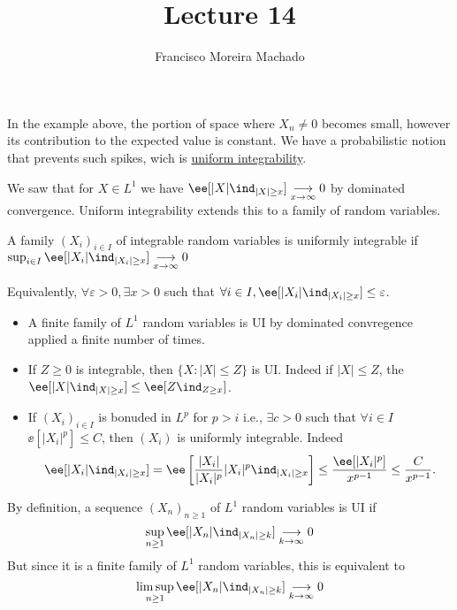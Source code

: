 \documentclass[../main.tex]{subfiles}
\author{Francisco Moreira Machado}
\title{Lecture 14}
\begin{document}
In the example above, the portion of space where $X_n \neq 0$ becomes small, 
however its contribution to the expected value is constant. We have 
a probabilistic notion that prevents such spikes, wich is \underline{uniform
integrability}.

\vspace{0.5em}

\noindent
We saw that for $X \in L^1$ we have $\ee[|X| \ind_{|X| \geq x}] \underset{x \to
\infty}{\longrightarrow} 0$ by dominated convergence.
Uniform integrability extends this to a family of random variables.

\begin{definition}
  A family $(X_i)_{i \in I}$ of integrable random variables is uniformly
  integrable if $\sup_{i \in I} \ee[|X_i| \ind_{|X_i| \geq x}] \underset{x \to
  \infty}{\longrightarrow}0$
\end{definition}

Equivalently, $\forall \varepsilon > 0, \exists x > 0$ such that $\forall i \in
I, \ee[|X_i| \ind_{|X_i| \geq x}] \leq \varepsilon$.

\begin{example}
    \hfill
    \begin{itemize}
      \item A finite family of $L^1$ random variables is UI by dominated
        convregence applied a finite number of times.
      \item If $Z \geq 0$ is integrable, then $\{ X \colon |X| \leq Z \} $ is
        UI. Indeed if $|X| \leq Z$, the $\ee[|X| \ind_{|X|\geq x}] \leq \ee[Z
        \ind_{Z \geq x}]$.
      \item If $(X_i)_{i \in I}$ is bonuded in $L^p$ for $p > i$ i.e., $\exists
        c>0$ such that $\forall i \in I$ $\ee[|X_i|^p] \leq C$, then $(X_i)$ is
        uniformly integrable. Indeed 
        \[
          \ee[|X_i|\ind_{|X_i| \geq x}] = 
          \ee\left[\frac{|X_i|}{|X_i|^p} |X_i|^p\ind_{|X_i| \geq x}\right] \leq
          \frac{\ee[|X_i|^p]}{x^{p-1}} \leq \frac{C}{x^{p-1}} 
        .\] 
    \end{itemize}
\end{example}

\begin{remark}
  By definition, a sequence $(X_n)_{n \geq 1}$ of $L^1$ random variables is UI
  if $$\sup_{n \geq 1} \ee[|X_n|\ind_{|X_n| \geq k}] \underset{k \to
  \infty}{\longrightarrow}0$$ But since it is a finite family of  $L^1$ random
  variables, this is equivalent to
  $$\limsup_{n \geq 1} \ee[|X_n|\ind_{|X_n| \geq k}] \underset{k \to
  \infty}{\longrightarrow}0$$
\end{remark}
\end{document}
